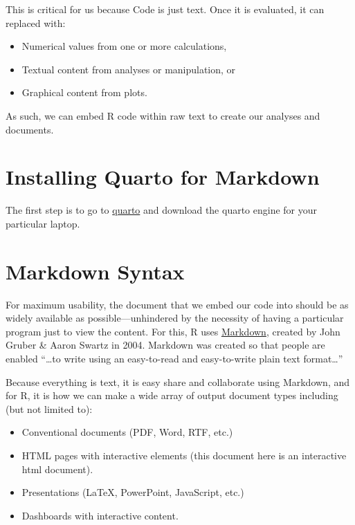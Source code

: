 \documentclass[
  letterpaper,
]{book}
\providecommand{\tightlist}{%
  \setlength{\itemsep}{0pt}\setlength{\parskip}{0pt}}
\begin{document}
This is critical for us because Code is just text. Once it is evaluated,
it can replaced with:

\begin{itemize}
\tightlist
\item
  Numerical values from one or more calculations,
\item
  Textual content from analyses or manipulation, or
\item
  Graphical content from plots.
\end{itemize}

As such, we can embed R code within raw text to create our analyses and
documents.

\section{Installing Quarto for
Markdown}\label{installing-quarto-for-markdown}

The first step is to go to \href{https://quarto.org}{quarto} and
download the quarto engine for your particular laptop.

\section{Markdown Syntax}\label{markdown-syntax}

For maximum usability, the document that we embed our code into should
be as widely available as possible---unhindered by the necessity of
having a particular program just to view the content. For this, R uses
\href{https://en.wikipedia.org/wiki/Markdown}{Markdown}, created by John
Gruber \& Aaron Swartz in 2004. Markdown was created so that people are
enabled ``\ldots to write using an easy-to-read and easy-to-write plain
text format\ldots{}''

Because everything is text, it is easy share and collaborate using
Markdown, and for R, it is how we can make a wide array of output
document types including (but not limited to):

\begin{itemize}
\tightlist
\item
  Conventional documents (PDF, Word, RTF, etc.)
\item
  HTML pages with interactive elements (this document here is an
  interactive html document).
\item
  Presentations (LaTeX, PowerPoint, JavaScript, etc.)
\item
  Dashboards with interactive content.
\end{itemize}
\end{document}
